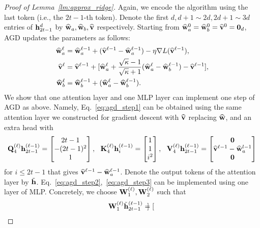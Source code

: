 \begin{proof}[Proof of Lemma~\ref{lm:approx_ridge}]
Again, we encode the algorithm using the last token (i.e., the $2t-1$-th token).
Denote the first $d,d+1\sim 2d, 2d+1\sim3d $ entries of ${\mathbf h}_{2t-1}^{{d}}$ by $\widehat{{\mathbf w}}_a,\widehat{{\mathbf w}}_b,\widehat{{\mathbf v}}$ respectively. Starting from $\widehat{{\mathbf w}}_a^{0}=\widehat{{\mathbf w}}_b^{0}=\widehat{{\mathbf v}}^{0}={\mathbf 0}_d$,  AGD updates the parameters as follows:
\begin{subequations}
\begin{align}
    \widehat{{\mathbf w}}^\ell_a&=\widehat{{\mathbf w}}_a^{\ell-1}+(\widehat{{\mathbf v}}^{\ell-1}-\widehat{{\mathbf w}}_a^{\ell-1})-\eta \nabla L(\widehat{{\mathbf v}}^{\ell-1}),\label{eq:agd_step1}\\
    \widehat{{\mathbf v}}^{\ell}&=\widehat{{\mathbf v}}^{\ell-1}+[\widehat{{\mathbf w}}^\ell_a+\frac{\sqrt{\kappa}-1}{\sqrt{\kappa}+1}(\widehat{{\mathbf w}}^\ell_a-\widehat{{\mathbf w}}^{\ell-1}_b)-\widehat{{\mathbf v}}^{\ell-1}],\label{eq:agd_step2}\\
    \widehat{{\mathbf w}}^\ell_b&= \widehat{{\mathbf w}}^{\ell-1}_b+( \widehat{{\mathbf w}}^\ell_a-\widehat{{\mathbf w}}^{\ell-1}_b).\label{eq:agd_step3}
\end{align}
\end{subequations}
We show that one attention layer and one MLP layer can implement one step of AGD as above. Namely, Eq.~\eqref{eq:agd_step1} can be obtained using the same attention layer we constructed for gradient descent with $\widehat{{\mathbf v}}$ replacing $\widehat{{\mathbf w}}$, and an extra head with
\begin{align*}
     {\mathbf Q}_4^{(\ell)}{\mathbf h}^{(\ell-1)}_{2t-1}=\begin{bmatrix}
         2t-1\\-(2t-1)^2\\ 1
    \end{bmatrix},~~ {\mathbf K}_4^{(\ell)}{\mathbf h}^{(\ell-1)}_{i}=\begin{bmatrix}
        1\\ 1 \\i^2
    \end{bmatrix},~~ {\mathbf V}_4^{(\ell)}{\mathbf h}^{(\ell-1)}_{2t-1}=\begin{bmatrix}
        {\mathbf 0}\\ \widehat{{\mathbf v}}^{\ell-1}-\widehat{{\mathbf w}}_a^{l-1}\\ {\mathbf 0}
    \end{bmatrix}
\end{align*} for $i\leq 2t-1$ that gives $\widehat{{\mathbf v}}^{\ell-1}-\widehat{{\mathbf w}}_a^{\ell-1}$.
Denote the output tokens of the attention layer by $\tilde {{\mathbf h}}$. Eq.~\eqref{eq:agd_step2},~\eqref{eq:agd_step3} can be implemented using one layer of MLP. Concretely, we choose ${\mathbf W}_{1}^{(\ell)},{\mathbf W}_{2}^{(\ell)}$ such that
\begin{align*}
     &{\mathbf W}_1^{(\ell)}\tilde{{\mathbf h}}^{(\ell-1)}_{2t-1}=\begin{bmatrix}

\end{bmatrix}
\end{align*}
\end{proof}
